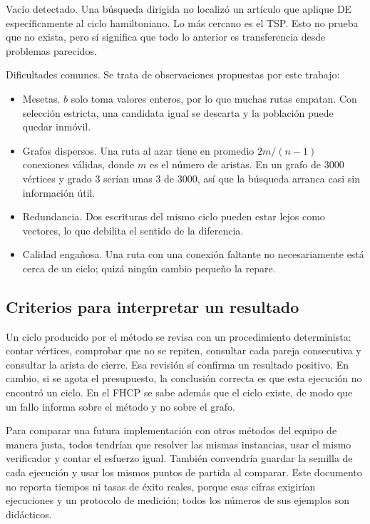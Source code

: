 Vacío detectado. Una búsqueda dirigida no localizó un artículo que aplique DE específicamente al ciclo hamiltoniano. Lo más cercano es el TSP.\cite{de14} Esto no prueba que no exista, pero sí significa que todo lo anterior es transferencia desde problemas parecidos.

Dificultades comunes. Se trata de observaciones propuestas por este trabajo:
\begin{itemize}[leftmargin=*]
\item Mesetas. $b$ solo toma valores enteros, por lo que muchas rutas empatan. Con selección estricta, una candidata igual se descarta y la población puede quedar inmóvil.
\item Grafos dispersos. Una ruta al azar tiene en promedio $2m/(n-1)$ conexiones válidas, donde $m$ es el número de aristas. En un grafo de 3000 vértices y grado 3 serían unas 3 de 3000, así que la búsqueda arranca casi sin información útil.
\item Redundancia. Dos escrituras del mismo ciclo pueden estar lejos como vectores, lo que debilita el sentido de la diferencia.
\item Calidad engañosa. Una ruta con una conexión faltante no necesariamente está cerca de un ciclo; quizá ningún cambio pequeño la repare.
\end{itemize}

\subsection{Criterios para interpretar un resultado}
Un ciclo producido por el método se revisa con un procedimiento determinista: contar vértices, comprobar que no se repiten, consultar cada pareja consecutiva y consultar la arista de cierre. Esa revisión sí confirma un resultado positivo. En cambio, si se agota el presupuesto, la conclusión correcta es que esta ejecución no encontró un ciclo. En el FHCP se sabe además que el ciclo existe,\cite{de3} de modo que un fallo informa sobre el método y no sobre el grafo.

Para comparar una futura implementación con otros métodos del equipo de manera justa, todos tendrían que resolver las mismas instancias, usar el mismo verificador y contar el esfuerzo igual. También convendría guardar la semilla de cada ejecución y usar los mismos puntos de partida al comparar.\cite{de5} Este documento no reporta tiempos ni tasas de éxito reales, porque esas cifras exigirían ejecuciones y un protocolo de medición; todos los números de sus ejemplos son didácticos.

